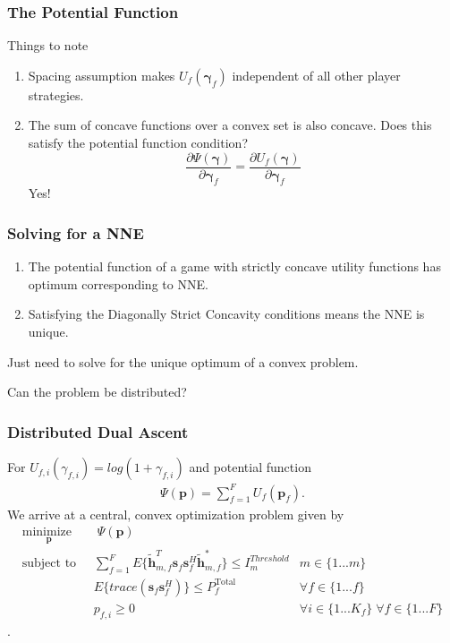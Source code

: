 \documentclass[10pt,tgadventor, onlymath]{beamer}
\begin{document}
\begin{frame}
\frametitle{The Potential Function}
Things to note
\begin{enumerate}
\item
	Spacing assumption makes $U_{f}(\boldsymbol{\gamma}_{f})$ independent of all other player strategies. 

\item
	The sum of concave functions over a convex set is also concave. Does this satisfy the potential function condition?
	\begin{equation*}\label{potential_game_condition}
\frac{\partial \Psi(\boldsymbol{\gamma})}{\partial \boldsymbol{\gamma}_{f}}
 =
 \frac{\partial U_f(\boldsymbol{\gamma})}{\partial \boldsymbol{\gamma}_{f}}
\end{equation*} 
Yes!
\end{enumerate}

\end{frame}

\begin{frame}
\frametitle{Solving for a NNE}
\begin{enumerate}
\setlength\itemsep{2em}

\item
	The potential function of a game with strictly concave utility functions has optimum corresponding to NNE.
\item
	Satisfying the Diagonally Strict Concavity conditions means the NNE is unique.
\end{enumerate}
\bigskip
Just need to solve for the unique optimum of a convex problem.
\pause
\par
 Can the problem be distributed?
\end{frame}

\begin{frame}
\frametitle{Distributed Dual Ascent}
For $U_{f,i}(\gamma_{f,i}) = log(1+\gamma_{f,i})$ and potential function
\begin{gather*} \label{Potential_Function}
\Psi(\mathbf{p}) = \sum_{f = 1}^{F} U_{f}(\mathbf{p}_{f}).
\end{gather*}
We arrive at a central, convex optimization problem given by
		\begin{subequations}
	\label{optim}
	\begin{align}
	    \underset{\mathbf{p}}{\text{minimize  }}
	    & \; \Psi(\mathbf{p}) \label{potential_game} \\
	    \text{subject to  } \; &
	  \sum^F_{f=1} E\{\tilde{\mathbf{h}}_{m,f}^T  \mathbf{s}_{f} 						
	\mathbf{s}_{f}^{H} \tilde{\mathbf{h}}_{m,f}^* \}\leq I^{Threshold}		
	_{m} & m \in \{1 ...m\} 
		\label{interference_const}\\
        & E\{trace(\mathbf{s}_f\mathbf{s}_f^H)\}  \leq P_{f}^{\text{Total}}  \label{power_const}
        & \forall f \in \{1 ... f\}\\
        & p_{f,i} \geq 0 &  \forall i \in \{1 ...K_{f}\} \; \forall f \in \{1 ... F\}\label{pos_power_const}
	\end{align}
	\end{subequations}.
\end{frame}
\end{document}
